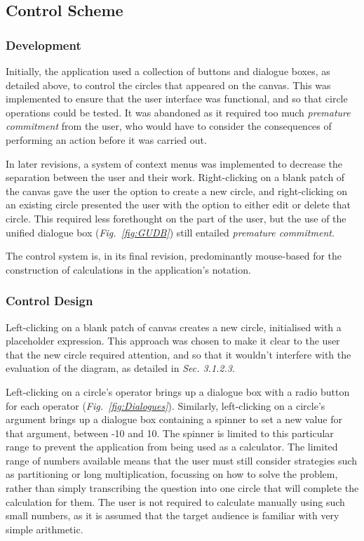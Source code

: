 \documentclass[12pt,twoside,notitlepage,xetex]{report}
\begin{document}
\subsection{Control Scheme}


\subsubsection{Development}

Initially, the application used a collection of buttons and dialogue boxes, as detailed above, to control the circles that appeared on the canvas.  This was implemented to ensure that the user interface was functional, and so that circle operations could be tested.  It was abandoned as it required too much \emph{premature commitment} from the user, who would have to consider the consequences of performing an action before it was carried out.

In later revisions, a system of context menus was implemented to decrease the separation between the user and their work.  Right-clicking on a blank patch of the canvas gave the user the option to create a new circle, and right-clicking on an existing circle presented the user with the option to either edit or delete that circle.  This required less forethought on the part of the user, but the use of the unified dialogue box (\emph{Fig.~\ref{fig:GUDB}}) still entailed \emph{premature commitment}.

The control system is, in its final revision, predominantly mouse-based for the construction of calculations in the application's notation.

\subsubsection{Control Design}

Left-clicking on a blank patch of canvas creates a new circle, initialised with a placeholder expression.  This approach was chosen to make it clear to the user that the new circle required attention, and so that it wouldn't interfere with the evaluation of the diagram, as detailed in \emph{Sec. 3.1.2.3}.

Left-clicking on a circle's operator brings up a dialogue box with a radio button for each operator (\emph{Fig.~\ref{fig:Dialogues}}).  Similarly, left-clicking on a circle's argument brings up a dialogue box containing a spinner to set a new value for that argument, between -10 and 10.  The spinner is limited to this particular range to prevent the application from being used as a calculator.  The limited range of numbers available means that the user must still consider strategies such as partitioning or long multiplication, focussing on how to solve the problem, rather than simply transcribing the question into one circle that will complete the calculation for them.  The user is not required to calculate manually using such small numbers, as it is assumed that the target audience is familiar with very simple arithmetic.
\end{document}
